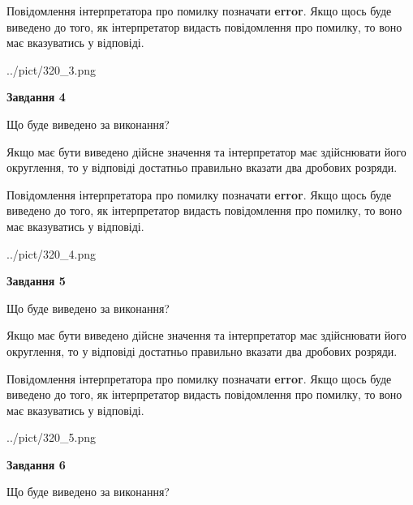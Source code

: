 \documentclass[12pt, ukrainian]{article}
\begin{document}
{\begin {Large}
Повідомлення інтерпретатора про помилку позначати \textbf{error}.
Якщо щось буде виведено до того, як інтерпретатор видасть повідомлення про помилку, 
то воно має вказуватись у відповіді. \par

\begin{center}
	{../pict/320_3.png}
\end{center}
\newpage

{\begin {center}\textbf{Завдання 4}\end {center}}\par
Що буде виведено за виконання? \par

Якщо має бути виведено дійсне значення та інтерпретатор має здійснювати його округлення, 
то у відповіді достатньо правильно вказати два дробових розряди.

Повідомлення інтерпретатора про помилку позначати \textbf{error}.
Якщо щось буде виведено до того, як інтерпретатор видасть повідомлення про помилку, 
то воно має вказуватись у відповіді. \par

\begin{center}
	{../pict/320_4.png}
\end{center}
\newpage

{\begin {center}\textbf{Завдання 5}\end {center}}\par
Що буде виведено за виконання? \par

Якщо має бути виведено дійсне значення та інтерпретатор має здійснювати його округлення, 
то у відповіді достатньо правильно вказати два дробових розряди.

Повідомлення інтерпретатора про помилку позначати \textbf{error}.
Якщо щось буде виведено до того, як інтерпретатор видасть повідомлення про помилку, 
то воно має вказуватись у відповіді. \par

\begin{center}
	{../pict/320_5.png}
\end{center}
\newpage

{\begin {center}\textbf{Завдання 6}\end {center}}\par
Що буде виведено за виконання? \par


\end{Large}}
\end{document}
